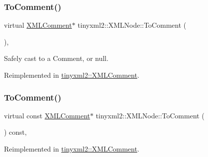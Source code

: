 \mbox{\label{classtinyxml2_1_1_x_m_l_node_aff47671055aa99840a1c1ebd661e63e3}} 
\subsubsection{\texorpdfstring{To\+Comment()}{ToComment()}\hspace{0.1cm}{\footnotesize\ttfamily [1/2]}}
{\footnotesize\ttfamily virtual \mbox{\hyperlink{classtinyxml2_1_1_x_m_l_comment}{X\+M\+L\+Comment}}$\ast$ tinyxml2\+::\+X\+M\+L\+Node\+::\+To\+Comment (\begin{DoxyParamCaption}{ }\end{DoxyParamCaption})\hspace{0.3cm}{\ttfamily [inline]}, {\ttfamily [virtual]}}



Safely cast to a Comment, or null. 



Reimplemented in \mbox{\hyperlink{classtinyxml2_1_1_x_m_l_comment_a8093e1dc8a34fa446d9dc3fde0e6c0ee}{tinyxml2\+::\+X\+M\+L\+Comment}}.

\mbox{\label{classtinyxml2_1_1_x_m_l_node_a6a53bb83faf5c0ccc95b6cf74dba0025}} 
\subsubsection{\texorpdfstring{To\+Comment()}{ToComment()}\hspace{0.1cm}{\footnotesize\ttfamily [2/2]}}
{\footnotesize\ttfamily virtual const \mbox{\hyperlink{classtinyxml2_1_1_x_m_l_comment}{X\+M\+L\+Comment}}$\ast$ tinyxml2\+::\+X\+M\+L\+Node\+::\+To\+Comment (\begin{DoxyParamCaption}{ }\end{DoxyParamCaption}) const\hspace{0.3cm}{\ttfamily [inline]}, {\ttfamily [virtual]}}



Reimplemented in \mbox{\hyperlink{classtinyxml2_1_1_x_m_l_comment_a8e60caf06d8e88876a94b81db026b85c}{tinyxml2\+::\+X\+M\+L\+Comment}}.

